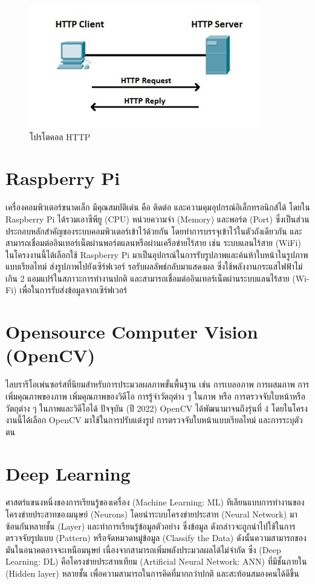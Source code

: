 \begin{figure}[!ht]
  \begin{center}
    \includegraphics[scale=.8]{pic/http.jpg}
    \caption[โปรโตคอล HTTP]{โปรโตคอล HTTP}
    \label{fig:http}
  \end{center}
\end{figure}

\section{Raspberry Pi}
เครื่องคอมพิวเตอร์ขนาดเล็ก มีคุณสมบัติเด่น คือ ติดต่อ และความคุมอุปกรณ์อิเล็กทรอนิกส์ได้ โดยใน Raspberry Pi 
ได้รวมเอาซีพียู (CPU) หน่วยความจำ (Memory) และพอร์ต (Port) ซึ่งเป็นส่วนประกอบหลักสำคัญของระบบคอมพิวเตอร์เข้าไว้ด้วยกัน 
โดยทำการบรรจุเข้าไว้ในตัวถังเดียวกัน และสามารถเชื่อมต่ออินเทอร์เน็ตผ่านพอร์ตแลนหรือผ่านเครือข่ายไร้สาย \cite{PI} เช่น ระบบแลนไร้สาย (WiFi)
	ในโครงงานนี้ได้เลือกใช้ Raspberry Pi มาเป็นอุปกรณ์ในการรับรูปภาพและค้นห้าใบหน้าในรูปภาพแบบเรียลไทม์ ส่งรูปภาพไปยังเซิร์ฟเวอร์ 
รอรับผลลัพธ์กลับมาแสดงผล ซึ่งใช้พลังงานกระแสไฟฟ้าไม่เกิน 2 แอมแปร์ในสภาวะการทำงานปกติ และสามารถเชื่อมต่ออินเทอร์เน็ตผ่านระบบแลนไร้สาย (Wi-Fi) 
เพื่อในการรับส่งข้อมูลจากเซิร์ฟเวอร์


\section{Opensource Computer Vision (OpenCV)}
ไลบรารีโอเพ่นซอร์สที่นิยมสำหรับการประมวลผลภาพขั้นพื้นฐาน เช่น การเบลอภาพ การผสมภาพ การเพิ่มคุณภาพของภาพ 
เพิ่มคุณภาพของวิดีโอ การรู้จำวัตถุต่าง ๆ ในภาพ หรือ การตรวจจับใบหน้าหรือวัตถุต่าง ๆ ในภาพและวิดีโอได้ 
ปัจจุบัน (ปี 2022) OpenCV ได้พัฒนามาจนถึงรุ่นที่ 4 โดยในโครงงานนี้ได้เลือก OpenCV มาใช้ในการปรับแต่งรูป 
การตรวจจับใบหน้าแบบเรียลไทม์ และการระบุตัวตน \cite{OpenCV}

\section{Deep Learning}
ศาสตร์แขนงหนึ่งของการเรียนรู้ของเครื่อง (Machine Learning: ML) ทีเลียนแบบการทำงานของโครงข่ายประสาทของมนุษย์ (Neurons) 
โดยนำระบบโครงข่ายประสาท (Neural Network) มาซ้อนกันหลายชั้น (Layer)
และทำการเรียนรู้ข้อมูลตัวอย่าง ซึ่งข้อมูล ดังกล่าวจะถูกนำไปใช้ในการตรวจจับรูปแบบ (Pattern) หรือจัดหมวดหมู่ข้อมูล (Classify the Data)
ดังนั้นความสามารถของมันในอนาคตอาจจะเหนือมนุษย์ เนื่องจากสามารถเพิ่มพลังประมวลผลได้ไม่จำกัด 
ซึ่ง (Deep Learning: DL) คือโครงข่ายประสาทเทียม (Artificial Neural Network: ANN) ที่มีชั้นภายใน (Hidden layer) หลายชั้น 
เพื่อความสามารถในการคิดที่มากกว่าปกติ และสะท้อนสมองคนได้ดีขึ้น \cite{DEEP}
\\


